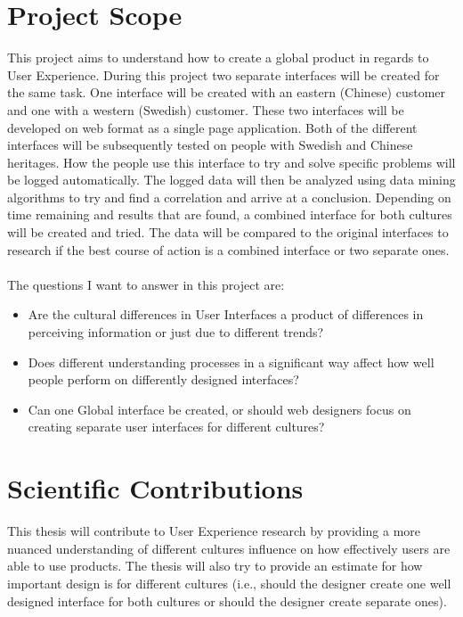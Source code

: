 \documentclass[a4paper, 11pt]{article} %
\begin{document}
	\section*{Project Scope}
	This project aims to understand how to create a global product in regards to User Experience. During this project two separate interfaces will be created for the same task. One interface will be created with an eastern (Chinese) customer and one with a western (Swedish) customer. These two interfaces will be developed on web format as a single page application. Both of the different interfaces will be subsequently tested on people with Swedish and Chinese heritages. How the people use this interface to try and solve specific problems will be logged automatically. The logged data will then be analyzed using data mining algorithms to try and find a correlation and arrive at a conclusion. Depending on time remaining and results that are found, a combined interface for both cultures will be created and tried. The data will be compared to the original interfaces to research if the best course of action is a combined interface or two separate ones.
	\\\\
	The questions I want to answer in this project are:
	
	\begin{itemize}
		\item Are the cultural differences in User Interfaces a product of differences in perceiving information or just due to different trends?
		\item Does different understanding processes in a significant way affect how well people perform on differently designed interfaces?
		\item Can one Global interface be created, or should web designers focus on creating separate user interfaces for different cultures?
	\end{itemize}
	
	
	\section*{Scientific Contributions}
	
	This thesis will contribute to User Experience research by providing a more nuanced understanding of different cultures influence on how effectively users are able to use products. The thesis will also try to provide an estimate for how important design is for different cultures (i.e., should the designer create one well designed interface for both cultures or should the designer create separate ones).
	
\end{document}
